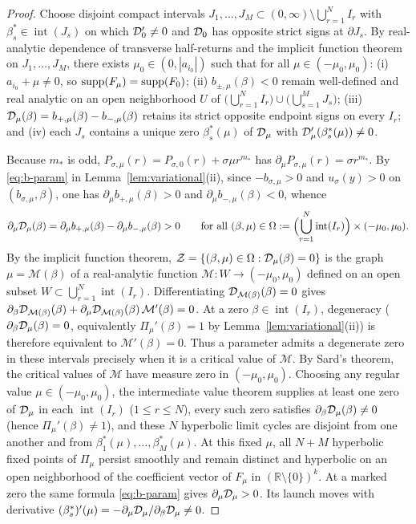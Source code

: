 \begin{proof}
Choose disjoint compact intervals $J_1,\dots,J_M\subset(0,\infty)\setminus\bigcup_{r=1}^N I_r$ with
$\beta_s^*\in\operatorname{int}(J_s)$ on which $\mathcal{D}_0'\ne 0$ and $\mathcal{D}_0$ has opposite strict signs
at $\partial J_s$. By real-analytic dependence of transverse half-returns and the implicit function
theorem on $J_1,\dots,J_M$, there exists $\mu_0\in(0,|a_{i_0}|)$ such that for all
$\mu\in(-\mu_0,\mu_0)$: (i) $a_{i_0}+\mu\ne 0$, so $\operatorname{supp}(F_\mu)=\operatorname{supp}(F_0)$; (ii)
$b_{\pm,\mu}(\beta)<0$ remain well-defined and real analytic on an open neighborhood $U$ of
$\bigl(\bigcup_{r=1}^N I_r\bigr)\cup\bigl(\bigcup_{s=1}^M J_s\bigr)$; (iii)
$\mathcal{D}_\mu(\beta)=b_{+,\mu}(\beta)-b_{-,\mu}(\beta)$ retains its strict opposite endpoint signs on
every $I_r$; and (iv) each $J_s$ contains a unique zero $\beta_s^*(\mu)$ of $\mathcal{D}_\mu$ with
$\mathcal{D}_\mu'(\beta_s^*(\mu))\ne 0$.

Because $m_*$ is odd, $P_{\sigma,\mu}(r)=P_{\sigma,0}(r)+\sigma\mu r^{m_*}$ has $\partial_\mu
P_{\sigma,\mu}(r)=\sigma r^{m_*}$. By \eqref{eq:b-param} in Lemma~\ref{lem:variational}(ii), since
$-b_{\sigma,\mu}>0$ and $u_\sigma(y)>0$ on $(b_{\sigma,\mu},\beta)$, one has $\partial_\mu
b_{+,\mu}(\beta)>0$ and $\partial_\mu b_{-,\mu}(\beta)<0$, whence
\[
  \partial_\mu \mathcal{D}_\mu(\beta) = \partial_\mu b_{+,\mu}(\beta) - \partial_\mu b_{-,\mu}(\beta) > 0
  \qquad \text{for all } (\beta,\mu)\in\Omega := \Bigl(\bigcup_{r=1}^N
  \operatorname{int}(I_r)\Bigr)\times(-\mu_0,\mu_0).
\]
By the implicit function theorem, $\mathcal{Z}=\{(\beta,\mu)\in\Omega : \mathcal{D}_\mu(\beta)=0\}$ is the
graph $\mu=\mathcal{M}(\beta)$ of a real-analytic function $\mathcal{M}:W\to(-\mu_0,\mu_0)$ defined on
an open subset $W\subset\bigcup_{r=1}^N\operatorname{int}(I_r)$. Differentiating
$\mathcal{D}_{\mathcal{M}(\beta)}(\beta)=0$ gives
$\partial_\beta\mathcal{D}_{\mathcal{M}(\beta)}(\beta)+\partial_\mu\mathcal{D}_{\mathcal{M}(\beta)}(\beta)\,\mathcal{M}'(\beta)=0$.
At a zero $\beta\in\operatorname{int}(I_r)$, degeneracy
($\partial_\beta\mathcal{D}_\mu(\beta)=0$, equivalently $\Pi_\mu'(\beta)=1$
by Lemma~\ref{lem:variational}(ii)) is therefore equivalent to
$\mathcal M'(\beta)=0$. Thus a parameter admits a degenerate zero in
these intervals precisely when it is a critical value of $\mathcal M$. By Sard's
theorem, the critical values of $\mathcal{M}$ have measure zero in $(-\mu_0,\mu_0)$. Choosing any
regular value $\mu\in(-\mu_0,\mu_0)$, the intermediate value theorem supplies at least one zero of
$\mathcal{D}_\mu$ in each $\operatorname{int}(I_r)$ ($1\le r\le N$), every such zero satisfies
$\partial_\beta\mathcal{D}_\mu(\beta)\ne 0$ (hence $\Pi_\mu'(\beta)\ne 1$), and these $N$ hyperbolic limit
cycles are disjoint from one another and from $\beta_1^*(\mu),\dots,\beta_M^*(\mu)$. At this fixed
$\mu$, all $N+M$ hyperbolic fixed points of $\Pi_\mu$ persist smoothly and remain distinct and
hyperbolic on an open neighborhood of the coefficient vector of $F_\mu$ in
$(\mathbb{R}\setminus\{0\})^k$.
At a marked zero the same formula \eqref{eq:b-param} gives
$\partial_\mu\mathcal{D}_\mu>0$. Its launch moves with derivative
$(\beta_s^*)'(\mu)=-\partial_\mu\mathcal{D}_\mu/\partial_\beta\mathcal{D}_\mu\ne0$.
\end{proof}

